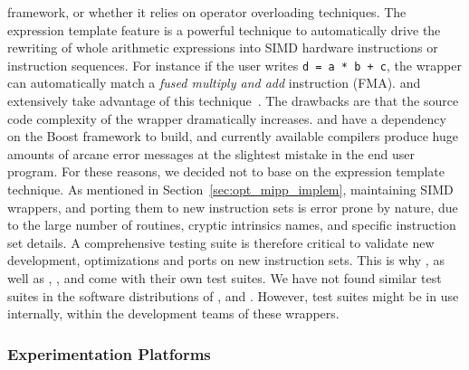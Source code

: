 framework, or whether it relies on operator overloading techniques. The
expression template feature is a powerful technique to automatically drive the
rewriting of whole arithmetic expressions into SIMD hardware instructions or
instruction sequences. For instance if the user writes \verb|d = a * b + c|, the
wrapper can automatically match a \emph{fused multiply and add} instruction
(FMA). \BoostSIMD and \bSIMD extensively take advantage of this
technique~\cite{Esterie2012, Esterie2012a}. The drawbacks are that the source
code complexity of the wrapper dramatically increases. \BoostSIMD and \bSIMD
have a dependency on the Boost framework to build, and currently available \Cxx
compilers produce huge amounts of arcane error messages at the slightest mistake
in the end user program. For these reasons, we decided not to base \MIPP on the
expression template technique. As mentioned in
Section~\ref{sec:opt_mipp_implem}, maintaining SIMD wrappers, and porting them
to new instruction sets is error prone by nature, due to the large number of
routines, cryptic intrinsics names, and specific instruction set details. A
comprehensive testing suite is therefore critical to validate new development,
optimizations and ports on new instruction sets. This is why \MIPP, as well as
\Vc, \BoostSIMD, \simdpp and \bSIMD come with their own test suites. We have not
found similar test suites in the software distributions of \VCL, \xsimd and
\TSIMD. However, test suites might be in use internally, within the development
teams of these wrappers.

\subsubsection{Experimentation Platforms}
\label{sec:opt_mipp_protocol}


